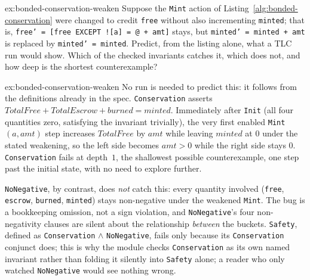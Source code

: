 \documentclass[11pt,a4paper]{article}
\theoremstyle{definition}
\theoremstyle{remark}
\begin{document}
\begin{pdexercise}[kind=Trace,rating=2]{ex:bonded-conservation-weaken}
Suppose the \texttt{Mint} action of Listing~\ref{alg:bonded-conservation} were changed to credit \texttt{free} without also incrementing \texttt{minted}; that is, \texttt{free' = [free EXCEPT ![a] = @ + amt]} stays, but \texttt{minted' = minted + amt} is replaced by \texttt{minted' = minted}. Predict, from the listing alone, what a TLC run would show. Which of the checked invariants catches it, which does not, and how deep is the shortest counterexample?
\end{pdexercise}
\begin{pdsolution}{ex:bonded-conservation-weaken}
No run is needed to predict this: it follows from the definitions already in the spec. \texttt{Conservation} asserts $\mathit{TotalFree} + \mathit{TotalEscrow} + \mathit{burned} = \mathit{minted}$. Immediately after \texttt{Init} (all four quantities zero, satisfying the invariant trivially), the very first enabled \texttt{Mint}$(a, \mathit{amt})$ step increases $\mathit{TotalFree}$ by $\mathit{amt}$ while leaving $\mathit{minted}$ at $0$ under the stated weakening, so the left side becomes $\mathit{amt} > 0$ while the right side stays $0$. \texttt{Conservation} fails at depth~$1$, the shallowest possible counterexample, one step past the initial state, with no need to explore further.

\texttt{NoNegative}, by contrast, does \emph{not} catch this: every quantity involved (\texttt{free}, \texttt{escrow}, \texttt{burned}, \texttt{minted}) stays non-negative under the weakened \texttt{Mint}. The bug is a bookkeeping omission, not a sign violation, and \texttt{NoNegative}'s four non-negativity clauses are silent about the relationship \emph{between} the buckets. \texttt{Safety}, defined as \texttt{Conservation} $\wedge$ \texttt{NoNegative}, fails only because its \texttt{Conservation} conjunct does; this is why the module checks \texttt{Conservation} as its own named invariant rather than folding it silently into \texttt{Safety} alone; a reader who only watched \texttt{NoNegative} would see nothing wrong.
\end{pdsolution}

\end{document}
